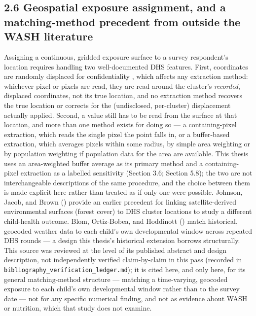 \subsection*{2.6 Geospatial exposure assignment, and a matching-method precedent from outside the WASH literature}

Assigning a continuous, gridded exposure surface to a survey respondent's location requires handling two well-documented DHS features. First, coordinates are randomly displaced for confidentiality \parencite{Burgert2013,PerezHeydrich2013}, which affects any extraction method: whichever pixel or pixels are read, they are read around the cluster's \textit{recorded}, displaced coordinates, not its true location, and no extraction method recovers the true location or corrects for the (undisclosed, per-cluster) displacement actually applied. Second, a value still has to be read from the surface at that location, and more than one method exists for doing so --- a containing-pixel extraction, which reads the single pixel the point falls in, or a buffer-based extraction, which averages pixels within some radius, by simple area weighting or by population weighting if population data for the area are available. This thesis uses an area-weighted buffer average as its primary method and a containing-pixel extraction as a labelled sensitivity (Section 3.6; Section 5.8); the two are not interchangeable descriptions of the same procedure, and the choice between them is made explicit here rather than treated as if only one were possible. Johnson, Jacob, and Brown (\citeyear{JohnsonJacobBrown2013}) provide an earlier precedent for linking satellite-derived environmental surfaces (forest cover) to DHS cluster locations to study a different child-health outcome. Blom, Ortiz-Bobea, and Hoddinott (\citeyear{Blom2022}) match historical, geocoded weather data to each child's own developmental window across repeated DHS rounds --- a design this thesis's historical extension borrows structurally. This source was reviewed at the level of its published abstract and design description, not independently verified claim-by-claim in this pass (recorded in \texttt{bibliography\_verification\_ledger.md}); it is cited here, and only here, for its general matching-method structure --- matching a time-varying, geocoded exposure to each child's own developmental window rather than to the survey date --- not for any specific numerical finding, and not as evidence about WASH or nutrition, which that study does not examine.

